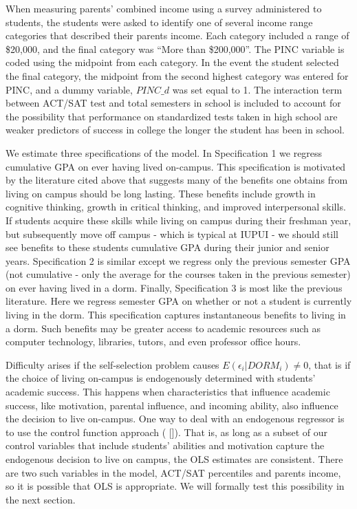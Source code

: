 \documentclass[12pt]{article}
\newcommand{\citeep}[1]{(\citename{#1} [\citeyear{#1}])}
\begin{document}
When measuring parents' combined income using a survey administered to students, the students were asked to identify one of several income range categories that described their parents income.  Each category included a range of \$20,000, and the final category was ``More than \$200,000''.  The PINC variable is coded using the  midpoint from each category.  In the event the student selected the final category, the midpoint from the second highest category was entered for PINC, and a dummy variable, $PINC\_d$ was set equal to 1.  The interaction term between ACT/SAT test and total semesters in school is included to account for the possibility that performance on standardized tests taken in high school are weaker predictors of success in college the longer the student has been in school.

We estimate three specifications of the model.  In Specification 1 we regress cumulative GPA on ever having lived on-campus.  This specification is motivated by the literature cited above that suggests many of the benefits one obtains from living on campus should be long lasting.  These benefits include growth in cognitive thinking, growth in critical thinking, and improved interpersonal skills.  If students acquire these skills while living on campus during their freshman year, but subsequently move off campus - which is typical at IUPUI - we should still see benefits to these students cumulative GPA during their junior and senior years.  Specification 2 is similar except we regress only the previous semester GPA (not cumulative - only the average for the courses taken in the previous semester) on ever having lived in a dorm.  Finally, Specification 3 is most like the previous literature.  Here we regress semester GPA on whether or not a student is currently living in the dorm.  This specification captures instantaneous benefits to living in a dorm.  Such benefits may be greater access to academic resources such as computer technology, libraries, tutors, and even professor office hours.  

Difficulty arises if the self-selection problem causes $E(\epsilon_i|DORM_i) \neq 0$, that is if the choice of living on-campus is endogenously determined with students' academic success.  This happens when characteristics that influence academic success, like motivation, parental influence, and incoming ability, also influence the decision to live on-campus.  One way to deal with an endogenous regressor is to use the control function approach \citeep{trivedi}.  That is, as long as a subset of our control variables that include students' abilities and motivation capture the endogenous decision to live on campus, the OLS estimates are consistent.  There are two such variables in the model, ACT/SAT percentiles and parents income, so it is possible that OLS is appropriate.  We will formally test this possibility in the next section.  
\end{document}
